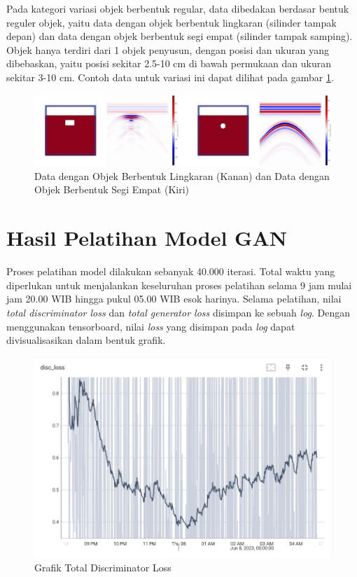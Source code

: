 Pada kategori variasi objek berbentuk regular, data dibedakan berdasar bentuk reguler objek, yaitu data dengan objek berbentuk lingkaran (silinder tampak depan) dan data dengan objek berbentuk segi empat (silinder tampak samping). 
Objek hanya terdiri dari 1 objek penyusun, dengan posisi dan ukuran yang dibebaskan, yaitu posisi sekitar 2.5-10 cm di bawah permukaan dan ukuran sekitar 3-10 cm. 
Contoh data untuk variasi ini dapat dilihat pada gambar \ref{fig:regularData}.

\begin{figure}[ht]
  \centering
  \includegraphics[scale=0.4]{gambar/variasi reguler.png}
  \caption{Data dengan Objek Berbentuk Lingkaran (Kanan) dan Data dengan Objek Berbentuk Segi Empat (Kiri)}
  \label{fig:regularData}
\end{figure}
\newpage

\section{Hasil Pelatihan Model GAN}
\label{sec:hasilpelatihanGAN}

Proses pelatihan model dilakukan sebanyak 40.000 iterasi. 
Total waktu yang diperlukan untuk menjalankan keseluruhan proses pelatihan selama 9 jam mulai jam 20.00 WIB hingga pukul 05.00 WIB esok harinya. 
Selama pelatihan, nilai \emph{total discriminator loss} dan \emph{total generator loss} disimpan ke sebuah \emph{log}. 
Dengan menggunakan tensorboard, nilai \emph{loss} yang disimpan pada \emph{log} dapat divisualisasikan dalam bentuk grafik. 

\begin{figure}[ht]
  \centering
  \includegraphics[scale=0.6]{gambar/Disc_loss.png}
  \caption{Grafik Total Discriminator Loss}
  \label{fig:discLoss}
\end{figure}

